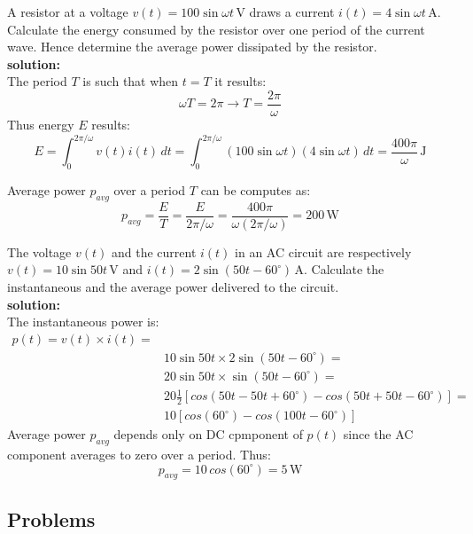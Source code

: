 \begin{exercise}
A resistor at a voltage $v(t)=100\sin\omega t\,\textrm{V}$ draws a current $i(t)=4 \sin\omega t\,\textrm{A}$. Calculate the energy consumed by the resistor over one period of the current wave. Hence determine the average power dissipated by the resistor.\\

\textbf{solution:}\\
The period $T$ is such that when $t=T$ it results:
\[\omega T = 2\pi \longrightarrow T = \frac{2\pi}{\omega}\]
Thus energy $E$ results:
\[E = \int_0^{2\pi/\omega}v(t)i(t)\,dt=\int_0^{2\pi/\omega}(100\sin\omega t)(4\sin\omega t)\,dt = \frac{400\pi}{\omega}\,\textrm{J}\]

Average power $p_{avg}$ over a period $T$ can be computes as:
\[p_{avg} = \frac{E}{T}=\frac{E}{2\pi/\omega}= \frac{400\pi}{\omega(2\pi/\omega)}=200\,\textrm{W}\]
\end{exercise}

\begin{exercise}
The voltage $v(t)$ and the current $i(t)$ in an AC circuit are respectively $v(t)=10\sin 50t\,\textrm{V}$ and $i(t)=2 \sin (50t -60^{\circ})\,\textrm{A}$. Calculate the instantaneous and the average power delivered to the circuit.\\

\textbf{solution:}\\
The instantaneous power is:
\begin{equation}
  \begin{split}
     p(t) = v(t) \times i(t) = \\
     & 10\sin 50t \times 2\sin(50t -60^{\circ}) = \\
     & 20\sin 50t \times \sin(50t -60^{\circ}) = \\
     & 20 \frac{1}{2}[cos(50t - 50t + 60^{\circ}) - cos(50t + 50t - 60^{\circ})] = \\
     & 10 [cos(60^{\circ}) - cos(100t - 60^{\circ})] \nonumber
  \end{split} 
\end{equation}
Average power $p_{avg}$ depends only on DC cpmponent of $p(t)$ since the AC component averages to zero over a period. Thus:
\[p_{avg} = 10\,cos(60^{\circ}) = 5\,\textrm{W}\]
\end{exercise}

\subsection*{Problems}


